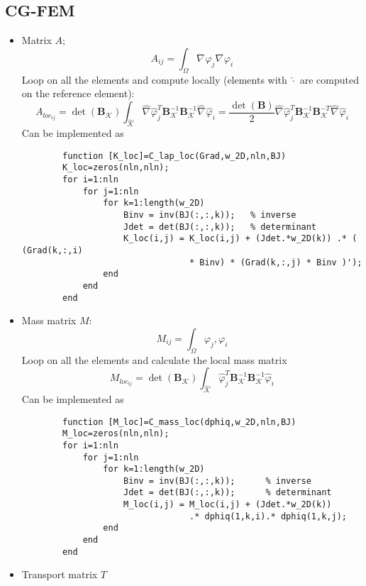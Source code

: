 \documentclass[a4paper,11pt]{article}
\theoremstyle{break}
\renewcommand*{\grad}{\nabla\mspace{1mu}}
\newcommand{\vect}[1]{\textbf{#1}}
\let\phi\varphi
\newcommand{\element}{\mathcal{K}}
\numberwithin{equation}{section}
\begin{document}
\subsection*{CG-FEM}
\begin{itemize}
    \item Matrix \(A\);
    \[
        A_{ij} = \int_\Omega \grad \phi_j \grad \phi_i  
    \]
    Loop on all the elements and compute locally (elements with \(\hat{\cdot}\) are computed on the reference element):
    \[
        A_{loc_{ij}} = \det(\vect{B}_\element) \int_{\hat{\element}} \hat{\grad} \hat{\phi}^T_j \vect{B}_\element^{-1} \vect{B}^{-1}_\element \hat{\grad} \hat{\phi}_i = \frac{\det(\vect{B})}{2} \hat{\grad} \hat{\phi}^T_j \vect{B}_\element^{-1} \vect{B}^{-T}_\element \hat{\grad} \hat{\phi}_i
    \]
    Can be implemented as 
    \begin{verbatim}
        function [K_loc]=C_lap_loc(Grad,w_2D,nln,BJ)
        K_loc=zeros(nln,nln);
        for i=1:nln
            for j=1:nln
                for k=1:length(w_2D)
                    Binv = inv(BJ(:,:,k));   % inverse
                    Jdet = det(BJ(:,:,k));   % determinant 
                    K_loc(i,j) = K_loc(i,j) + (Jdet.*w_2D(k)) .* ( (Grad(k,:,i)
                                 * Binv) * (Grad(k,:,j) * Binv )');
                end
            end
        end
    \end{verbatim}
    \item Mass matrix \(M\):
    \[
        M_{ij} = \int_\Omega \phi_j, \phi_i
    \]
    Loop on all the elements and calculate the local mass matrix
    \[
        M_{loc_{ij}} =  \det(\vect{B}_\element) \int_{\hat{\element}} \hat{\phi}^T_j \vect{B}_\element^{-1} \vect{B}^{-1}_\element \hat{\phi}_i
    \]
    Can be implemented as
    \begin{verbatim}
        function [M_loc]=C_mass_loc(dphiq,w_2D,nln,BJ)
        M_loc=zeros(nln,nln);
        for i=1:nln
            for j=1:nln
                for k=1:length(w_2D)
                    Binv = inv(BJ(:,:,k));      % inverse
                    Jdet = det(BJ(:,:,k));      % determinant 
                    M_loc(i,j) = M_loc(i,j) + (Jdet.*w_2D(k))
                                 .* dphiq(1,k,i).* dphiq(1,k,j);
                end
            end
        end
    \end{verbatim}
    \item Transport matrix \(T\)
    

\end{itemize}
\end{document}
